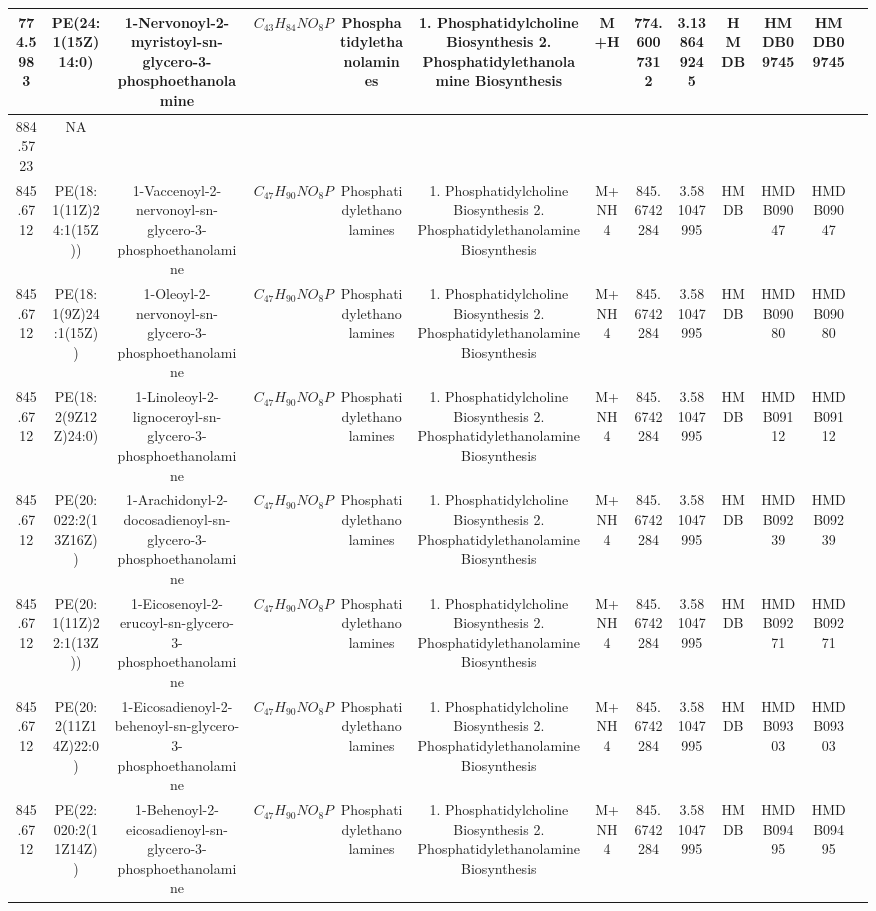 \documentclass{WileyMSP-template}
\begin{document}
\begin{landscape}
\begin{table}
\begin{adjustbox}{center}
{\begin{tabular}{|c|c|c|c|c|c|c|c|c|c|c|c|c|}
            774.5983 & PE(24:1(15Z)14:0) & 1-Nervonoyl-2-myristoyl-sn-glycero-3-phosphoethanolamine & $ C_{43}H_{84}NO_{8}P $ & Phosphatidylethanolamines & 1. Phosphatidylcholine Biosynthesis 2. Phosphatidylethanolamine Biosynthesis & M+H & 774.6007312 & 3.138649245 & HMDB & HMDB09745 & HMDB09745\\
            \bottomrule
            884.5723 & NA &  &  &  &  &  &  &  &  &  & \\
            \bottomrule
            845.6712 & PE(18:1(11Z)24:1(15Z)) & 1-Vaccenoyl-2-nervonoyl-sn-glycero-3-phosphoethanolamine & $ C_{47}H_{90}NO_{8}P $ & Phosphatidylethanolamines & 1. Phosphatidylcholine Biosynthesis 2. Phosphatidylethanolamine Biosynthesis & M+NH4 & 845.6742284 & 3.581047995 & HMDB & HMDB09047 & HMDB09047\\
            845.6712 & PE(18:1(9Z)24:1(15Z)) & 1-Oleoyl-2-nervonoyl-sn-glycero-3-phosphoethanolamine & $ C_{47}H_{90}NO_{8}P $ & Phosphatidylethanolamines & 1. Phosphatidylcholine Biosynthesis 2. Phosphatidylethanolamine Biosynthesis & M+NH4 & 845.6742284 & 3.581047995 & HMDB & HMDB09080 & HMDB09080\\
            845.6712 & PE(18:2(9Z12Z)24:0) & 1-Linoleoyl-2-lignoceroyl-sn-glycero-3-phosphoethanolamine & $ C_{47}H_{90}NO_{8}P $ & Phosphatidylethanolamines & 1. Phosphatidylcholine Biosynthesis 2. Phosphatidylethanolamine Biosynthesis & M+NH4 & 845.6742284 & 3.581047995 & HMDB & HMDB09112 & HMDB09112\\
            845.6712 & PE(20:022:2(13Z16Z)) & 1-Arachidonyl-2-docosadienoyl-sn-glycero-3-phosphoethanolamine & $ C_{47}H_{90}NO_{8}P $ & Phosphatidylethanolamines & 1. Phosphatidylcholine Biosynthesis 2. Phosphatidylethanolamine Biosynthesis & M+NH4 & 845.6742284 & 3.581047995 & HMDB & HMDB09239 & HMDB09239\\
            845.6712 & PE(20:1(11Z)22:1(13Z)) & 1-Eicosenoyl-2-erucoyl-sn-glycero-3-phosphoethanolamine & $ C_{47}H_{90}NO_{8}P $ & Phosphatidylethanolamines & 1. Phosphatidylcholine Biosynthesis 2. Phosphatidylethanolamine Biosynthesis & M+NH4 & 845.6742284 & 3.581047995 & HMDB & HMDB09271 & HMDB09271\\
            845.6712 & PE(20:2(11Z14Z)22:0) & 1-Eicosadienoyl-2-behenoyl-sn-glycero-3-phosphoethanolamine & $ C_{47}H_{90}NO_{8}P $ & Phosphatidylethanolamines & 1. Phosphatidylcholine Biosynthesis 2. Phosphatidylethanolamine Biosynthesis & M+NH4 & 845.6742284 & 3.581047995 & HMDB & HMDB09303 & HMDB09303\\
            845.6712 & PE(22:020:2(11Z14Z)) & 1-Behenoyl-2-eicosadienoyl-sn-glycero-3-phosphoethanolamine & $ C_{47}H_{90}NO_{8}P $ & Phosphatidylethanolamines & 1. Phosphatidylcholine Biosynthesis 2. Phosphatidylethanolamine Biosynthesis & M+NH4 & 845.6742284 & 3.581047995 & HMDB & HMDB09495 & HMDB09495\\

\end{tabular}}
\end{adjustbox}
\end{table}
\end{landscape}
\end{document}

